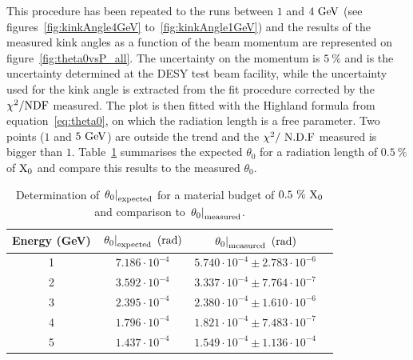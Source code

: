    This procedure has been repeated to the runs between $1$ and $4~\rm{GeV}$ (see figures~\ref{fig:kinkAngle4GeV} to~\ref{fig:kinkAngle1GeV}) and the results of the measured kink angles as a function of the beam momentum are represented on figure~\ref{fig:theta0vsP_all}. 
   The uncertainty on the momentum is $5~\%$ and is the uncertainty determined at the DESY test beam facility, while the uncertainty used for the kink angle is extracted from the fit procedure corrected by the $\chi^2 / \rm{NDF}$ measured.
   The plot is then fitted with the Highland formula from equation~\ref{eq:theta0}, on which the radiation length is a free parameter.
   Two points ($1$ and $5~\rm{GeV}$) are outside the trend and the $\chi^2 /~\rm{N.D.F}$ measured is bigger than $1$.
   Table~\ref{tab:theta0Calcultation} summarises the expected $\theta_0$ for a radiation length of $0.5~\%$ of $\rm{X_0}$ and compare this results to the measured $\theta_0$.

   \begin{table}
     \centering
     \begin{tabular}{c c c c}
        \hline %
        Energy (GeV)	& $\left. \theta_0\right|_{\rm{expected}}~(\rm{rad})$ & $\left. \theta_0\right|_{\rm{measured}}~(\rm{rad})$ \tabularnewline
        \hline %
        \hline %

        	1	  &		$7.186 \cdot 10^{-4}$	  &		$5.740 \cdot 10^{-4} \pm 2.783 \cdot 10^{-6}$	      \tabularnewline
        	2		&		$3.592 \cdot 10^{-4}$	  &		$3.337 \cdot 10^{-4} \pm 7.764 \cdot 10^{-7}$	      \tabularnewline
        	3		&		$2.395 \cdot 10^{-4}$	  &		$2.380 \cdot 10^{-4} \pm 1.610 \cdot 10^{-6}$       \tabularnewline
        	4		&		$1.796 \cdot 10^{-4}$	  &	  $1.821 \cdot 10^{-4} \pm 7.483 \cdot 10^{-7}$       \tabularnewline
        	5		&		$1.437 \cdot 10^{-4}$   &		$1.549 \cdot 10^{-4} \pm 1.136 \cdot 10^{-4}$	      \tabularnewline
        \hline %
     
     \end{tabular}
     \caption{Determination of $\left. \theta_0\right|_{\rm{expected}}$ for a material budget of $0.5~\%~\rm{X_0}$ and comparison to $\left. \theta_0\right|_{\rm{measured}}$.}
     \label{tab:theta0Calcultation}
   \end{table}

